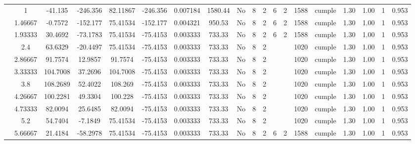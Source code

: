 \begin{table}[H]
{\begin{tabular}{|c|c|c|c|c|c|r|c|c|c|c|c|c|c|c|c|c|c|c|}
\cline{2-19}    & \cellcolor[rgb]{ .851,  .882,  .949}1 & -41.135 & -246.356 & 82.11867 & -246.356 & 0.007184 & 1580.44 & No  & 8   & 2   & 6   & 2   & 1588 & \cellcolor[rgb]{ .776,  .937,  .808}cumple & 1.30 & 1.00 & 1   & 0.953 \bigstrut\\
\cline{2-19}    & 1.46667 & -0.7572 & -152.177 & 75.41534 & -152.177 & 0.004321 & 950.53 & No  & 8   & 2   & 6   & 2   & 1588 & \cellcolor[rgb]{ .776,  .937,  .808}cumple & 1.30 & 1.00 & 1   & 0.953 \bigstrut\\
\cline{2-19}    & 1.93333 & 30.4692 & -73.1783 & 75.41534 & -75.4153 & 0.003333 & 733.33 & No  & 8   & 2   & 6   & 2   & 1588 & \cellcolor[rgb]{ .776,  .937,  .808}cumple & 1.30 & 1.00 & 1   & 0.953 \bigstrut\\
\cline{2-19}    & 2.4 & 63.6329 & -20.4497 & 75.41534 & -75.4153 & 0.003333 & 733.33 & No  & 8   & 2   &     &     & 1020 & \cellcolor[rgb]{ .776,  .937,  .808}cumple & 1.30 & 1.00 & 1   & 0.953 \bigstrut\\
\cline{2-19}    & 2.86667 & 91.7574 & 12.9857 & 91.7574 & -75.4153 & 0.003333 & 733.33 & No  & 8   & 2   &     &     & 1020 & \cellcolor[rgb]{ .776,  .937,  .808}cumple & 1.30 & 1.00 & 1   & 0.953 \bigstrut\\
\cline{2-19}    & 3.33333 & 104.7008 & 37.2696 & 104.7008 & -75.4153 & 0.003333 & 733.33 & No  & 8   & 2   &     &     & 1020 & \cellcolor[rgb]{ .776,  .937,  .808}cumple & 1.30 & 1.00 & 1   & 0.953 \bigstrut\\
\cline{2-19}    & 3.8 & 108.2689 & 52.4022 & 108.269 & -75.4153 & 0.003333 & 733.33 & No  & 8   & 2   &     &     & 1020 & \cellcolor[rgb]{ .776,  .937,  .808}cumple & 1.30 & 1.00 & 1   & 0.953 \bigstrut\\
\cline{2-19}    & 4.26667 & 100.2281 & 49.3304 & 100.228 & -75.4153 & 0.003333 & 733.33 & No  & 8   & 2   &     &     & 1020 & \cellcolor[rgb]{ .776,  .937,  .808}cumple & 1.30 & 1.00 & 1   & 0.953 \bigstrut\\
\cline{2-19}    & 4.73333 & 82.0094 & 25.6485 & 82.0094 & -75.4153 & 0.003333 & 733.33 & No  & 8   & 2   &     &     & 1020 & \cellcolor[rgb]{ .776,  .937,  .808}cumple & 1.30 & 1.00 & 1   & 0.953 \bigstrut\\
\cline{2-19}    & 5.2 & 54.7404 & -7.1849 & 75.41534 & -75.4153 & 0.003333 & 733.33 & No  & 8   & 2   &     &     & 1020 & \cellcolor[rgb]{ .776,  .937,  .808}cumple & 1.30 & 1.00 & 1   & 0.953 \bigstrut\\
\cline{2-19}    & 5.66667 & 21.4184 & -58.2978 & 75.41534 & -75.4153 & 0.003333 & 733.33 & No  & 8   & 2   & 6   & 2   & 1588 & \cellcolor[rgb]{ .776,  .937,  .808}cumple & 1.30 & 1.00 & 1   & 0.953 \bigstrut\\

\end{tabular}}
\end{table}
